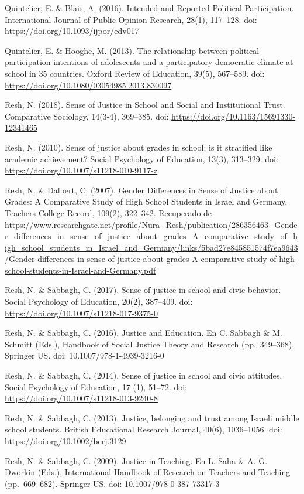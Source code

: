\documentclass[12pt,twoside]{templates/facsothesis}
\begin{document}
Quintelier, E. \& Blais, A. (2016). Intended and Reported Political Participation. International Journal of Public Opinion Research, 28(1), 117--128. doi: \url{https://doi.org/10.1093/ijpor/edv017}

Quintelier, E. \& Hooghe, M. (2013). The relationship between political participation intentions of adolescents and a participatory democratic climate at school in 35 countries. Oxford Review of Education, 39(5), 567--589. doi: \url{https://doi.org/10.1080/03054985.2013.830097}

Resh, N. (2018). Sense of Justice in School and Social and Institutional Trust. Comparative Sociology, 14(3-4), 369--385. doi: \url{https://doi.org/10.1163/15691330-12341465}

Resh, N. (2010). Sense of justice about grades in school: is it stratified like academic achievement? Social Psychology of Education, 13(3), 313--329. doi: \url{https://doi.org/10.1007/s11218-010-9117-z}

Resh, N. \& Dalbert, C. (2007). Gender Differences in Sense of Justice about Grades: A Comparative Study of High School Students in Israel and Germany. Teachers College Record, 109(2), 322--342. Recuperado de \url{https://www.researchgate.net/profile/Nura_Resh/publication/286356463_Gender_differences_in_sense_of_justice_about_grades_A_comparative_study_of_high_school_students_in_Israel_and_Germany/links/5bad27e845851574f7ea9643/Gender-differences-in-sense-of-justice-about-grades-A-comparative-study-of-high-school-students-in-Israel-and-Germany.pdf}

Resh, N. \& Sabbagh, C. (2017). Sense of justice in school and civic behavior. Social Psychology of Education, 20(2), 387--409. doi: \url{https://doi.org/10.1007/s11218-017-9375-0}

Resh, N. \& Sabbagh, C. (2016). Justice and Education. En C. Sabbagh \& M. Schmitt (Eds.), Handbook of Social Justice Theory and Research (pp.~349--368). Springer US. doi: 10.1007/978-1-4939-3216-0

Resh, N. \& Sabbagh, C. (2014). Sense of justice in school and civic attitudes. Social Psychology of Education, 17 (1), 51--72. doi: \url{https://doi.org/10.1007/s11218-013-9240-8}

Resh, N. \& Sabbagh, C. (2013). Justice, belonging and trust among Israeli middle school students. British Educational Research Journal, 40(6), 1036--1056. doi: \url{https://doi.org/10.1002/berj.3129}

Resh, N. \& Sabbagh, C. (2009). Justice in Teaching. En L. Saha \& A. G. Dworkin (Eds.), International Handbook of Research on Teachers and Teaching (pp.~669--682). Springer US. doi: 10.1007/978-0-387-73317-3
\end{document}
